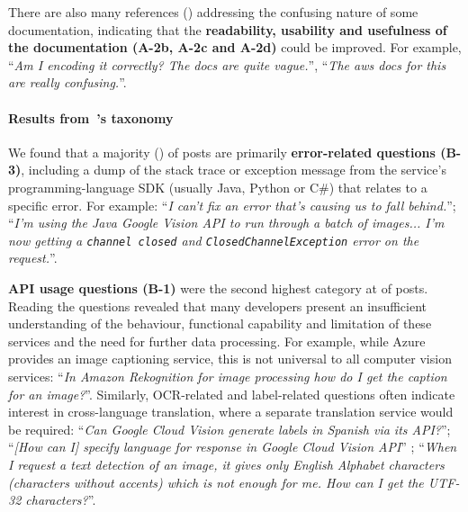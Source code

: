There are also many references (\PctTaxADocumentation{}) addressing the confusing nature of some documentation, indicating that the \textbf{readability, usability and usefulness of the documentation (A-2b, A-2c and A-2d)} could be improved. For example, ``\textit{Am I encoding it correctly? The docs are quite vague.}'', ``\textit{The aws docs for this are really confusing.}''.

\paragraph{Results from~\citeauthor{Beyer:2018fm}'s taxonomy}
\label{icse2020:sub:sub:resultsB}

We found that a majority (\PctTaxBErrors{}) of posts are primarily \textbf{error-related questions (B-3)}, including a dump of the stack trace or exception message from the service's programming-language SDK (usually Java, Python or C\#) that relates to a specific error. For example: ``\textit{I can't fix an error that's causing us to fall behind.}''; ``\textit{I'm using the Java Google Vision API to run through a batch of images... I'm now getting a \texttt{channel closed} and \texttt{ClosedChannelException} error on the request.}''. 

\textbf{API usage questions (B-1)} were the second highest category at \PctTaxBAPIUsage{} of posts. Reading the questions revealed that many developers present an insufficient understanding of the behaviour, functional capability and limitation of these services and the need for further data processing. For example, while Azure provides an image captioning service, this is not universal to all computer vision services: ``\textit{In Amazon Rekognition for image processing how do I get the caption for an image?}''. Similarly, OCR-related and label-related questions often indicate interest in cross-language translation, where a separate translation service would be required: ``\textit{Can Google Cloud Vision generate labels in Spanish via its API?}''; ``\textit{[How can I] specify language for response in Google Cloud Vision API}'' ; ``\textit{When I request a text detection of an image, it gives only English Alphabet characters (characters without accents) which is not enough for me. How can I get the UTF-32 characters?}''.

